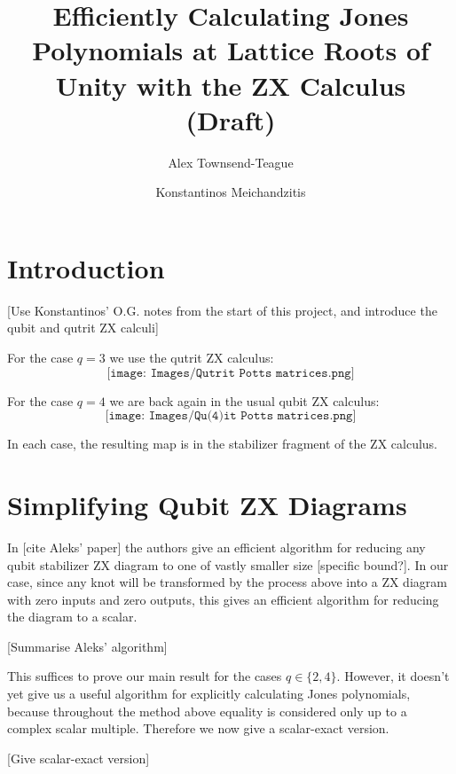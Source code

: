 \documentclass[11pt, oneside]{article}      %
\title{\textbf{Efficiently Calculating Jones Polynomials at Lattice Roots of Unity with the ZX Calculus (Draft)}}
\author{
  Alex Townsend-Teague
  \and
  Konstantinos Meichandzitis
}
\date{}
\theoremstyle{definition}
\begin{document}
\maketitle

\section{Introduction}

[Use Konstantinos' O.G. notes from the start of this project, and introduce the qubit and qutrit ZX calculi]\newline

For the case $q=3$ we use the qutrit ZX calculus:
\begin{equation}
\texttt{[image: Images/Qutrit Potts matrices.png]}
\end{equation}

For the case $q=4$ we are back again in the usual qubit ZX calculus:
\begin{equation}
\texttt{[image: Images/Qu(4)it Potts matrices.png]}
\end{equation}

In each case, the resulting map is in the stabilizer fragment of the ZX calculus. 

\section{Simplifying Qubit ZX Diagrams}

In [cite Aleks' paper] the authors give an efficient algorithm for reducing any qubit stabilizer ZX diagram to one of vastly smaller size [specific bound?]. In our case, since any knot will be transformed by the process above into a ZX diagram with zero inputs and zero outputs, this gives an efficient algorithm for reducing the diagram to a scalar.\newline

[Summarise Aleks' algorithm]\newline

This suffices to prove our main result for the cases $q \in \{2, 4\}$. However, it doesn't yet give us a useful algorithm for explicitly calculating Jones polynomials, because throughout the method above equality is considered only up to a complex scalar multiple. Therefore we now give a scalar-exact version.\newline

[Give scalar-exact version]\newline
\end{document}
